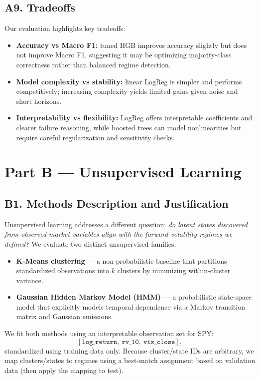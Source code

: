 \documentclass[11pt]{article}
\begin{document}
\subsection{A9. Tradeoffs}
Our evaluation highlights key tradeoffs:
\begin{itemize}
    \item \textbf{Accuracy vs Macro F1:} tuned HGB improves accuracy slightly but does not improve Macro F1, suggesting it may be optimizing majority-class correctness rather than balanced regime detection.
    \item \textbf{Model complexity vs stability:} linear LogReg is simpler and performs competitively; increasing complexity yields limited gains given noise and short horizons.
    \item \textbf{Interpretability vs flexibility:} LogReg offers interpretable coefficients and clearer failure reasoning, while boosted trees can model nonlinearities but require careful regularization and sensitivity checks.
\end{itemize}

\newpage
\section{Part B --- Unsupervised Learning}
\subsection{B1. Methods Description and Justification}
Unsupervised learning addresses a different question: \textit{do latent states discovered from observed market variables align with the forward-volatility regimes we defined?} We evaluate two distinct unsupervised families:
\begin{itemize}
    \item \textbf{K-Means clustering} --- a non-probabilistic baseline that partitions standardized observations into $k$ clusters by minimizing within-cluster variance.
    \item \textbf{Gaussian Hidden Markov Model (HMM)} --- a probabilistic state-space model that explicitly models temporal dependence via a Markov transition matrix and Gaussian emissions.
\end{itemize}

We fit both methods using an interpretable observation set for SPY:
\[
[\texttt{log\_return},\ \texttt{rv\_10},\ \texttt{vix\_close}],
\]
standardized using training data only. Because cluster/state IDs are arbitrary, we map clusters/states to regimes using a best-match assignment based on validation data (then apply the mapping to test).
\end{document}
